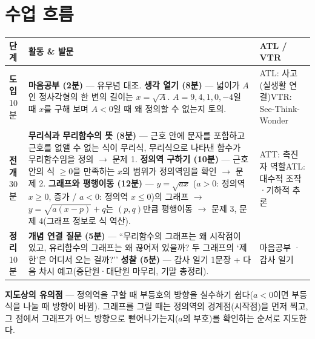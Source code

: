 \documentclass[11pt,a4paper]{article}
\begin{document}
\section{수업 흐름}
\begin{tabularx}{\linewidth}{@{}>{\centering\arraybackslash}p{1.6cm}X>{\raggedright\arraybackslash\small}p{3.1cm}@{}}
\toprule
\textbf{단계} & \textbf{활동 \& 발문} & \textbf{ATL / VTR} \\
\midrule
\textcolor{goldstrong}{\textbf{도입}}\newline\footnotesize 10분 &
\textbf{마음공부 (2분)} --- 유무념 대조.\newline
\textbf{생각 열기 (8분)} --- 넓이가 $A$인 정사각형의 한 변의 길이는 $x=\sqrt A$. $A=9,4,1,0,-4$일 때 $x$를 구해 보며 $A<0$일 때 왜 정의할 수 없는지 토의. &
ATL: 사고(실생활 연결)\newline VTR: See-Think-Wonder \\
\addlinespace
\textcolor{goldstrong}{\textbf{전개}}\newline\footnotesize 30분 &
\textbf{무리식과 무리함수의 뜻 (8분)} --- 근호 안에 문자를 포함하고 근호를 없앨 수 없는 식이 무리식, 무리식으로 나타낸 함수가 무리함수임을 정의 $\to$ 문제 1.\newline
\textbf{정의역 구하기 (10분)} --- 근호 안의 식 $\geq0$을 만족하는 $x$의 범위가 정의역임을 확인 $\to$ 문제 2.\newline
\textbf{그래프와 평행이동 (12분)} --- $y=\sqrt{ax}$ ($a>0$: 정의역 $x\geq0$, 증가 / $a<0$: 정의역 $x\leq0$)의 그래프 $\to$ $y=\sqrt{a(x-p)}+q$는 $(p,q)$만큼 평행이동 $\to$ 문제 3, 문제 4(그래프 정보로 식 역산). &
ATT: 촉진자 역할\newline ATL: 대수적 조작·기하적 추론 \\
\addlinespace
\textcolor{goldstrong}{\textbf{정리}}\newline\footnotesize 10분 &
\textbf{개념 연결 질문 (5분)} --- ``무리함수의 그래프는 왜 시작점이 있고, 유리함수의 그래프는 왜 끊어져 있을까? 두 그래프의 `제한'은 어디서 오는 걸까?''\newline
\textbf{성찰 (5분)} --- 감사 일기 1문장 + 다음 차시 예고(중단원·대단원 마무리, 기말 총정리). &
마음공부 · 감사 일기 \\
\bottomrule
\end{tabularx}

\begin{calloutbox}
\textbf{지도상의 유의점} --- 정의역을 구할 때 부등호의 방향을 실수하기 쉽다($a<0$이면 부등식을 나눌 때 방향이 바뀜). 그래프를 그릴 때는 정의역의 경계점(시작점)을 먼저 찍고, 그 점에서 그래프가 어느 방향으로 뻗어나가는지($a$의 부호)를 확인하는 순서로 지도한다.
\end{calloutbox}
\end{document}
